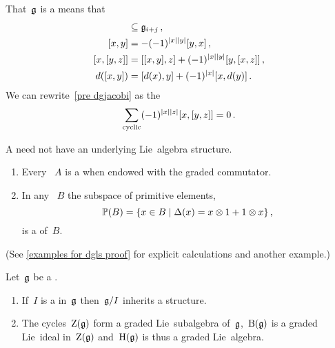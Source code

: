 \documentclass[a4paper,10pt,headings=standardclasses]{scrartcl}
\begin{document}
\begin{remark}
  That~$\mathfrak{g}$ is a {\dgl} means that
  \begin{align}
    [\glie_i, \glie_j]
    &\subseteq
    \glie_{i+j} \,,
    \notag
  \\
    [x,y]
    &=
    -(-1)^{\hdeg{x} \hdeg{y}} [y,x] \,,
    \notag
  \\
    [x, [y,z]]
    &=
    [[x,y], z]
    +
    (-1)^{\hdeg{x} \hdeg{y}}
    [y, [x,z]] \,,
    \label{pre dgjacobi}
  \\
    d([x,y])
    &=
    [d(x), y] + (-1)^{\hdeg{x}} [x, d(y)] \,.
    \notag
  \end{align}
  We can rewrite~\eqref{pre dgjacobi} as the 
  \[
    \sum_{\text{cyclic}}
    (-1)^{\lvert x\rvert \lvert z\rvert} [x, [y,z]]
    =
    0 \,.
  \]
\end{remark}

\begin{warning}
  A {\dgl} need not have an underlying Lie~algebra structure.
\end{warning}

\begin{example}
  \label{examples for dgls}
  \leavevmode
  \begin{enumerate}
    \item
      Every {\dga}~$A$ is a {\dgl} when endowed with the graded commutator.
    \item
      In any {\dgb}~$B$ the subspace of primitive elements,
      \[
        \prim(B)
        =
        \{
          x \in B
        \suchthat
          \Delta(x) = x \tensor 1 + 1 \tensor x
        \} \,,
      \]
      is a {\dglsub} of~$B$.
  \end{enumerate}
  (See \cref{examples for dgls proof} for explicit calculations and another example.)
\end{example}

\begin{lemma}
  \label{induced dgl}
  Let~$\mathfrak{g}$ be a {\dgl}.
  \begin{enumerate}
    \item
      If~$I$ is a {\dgli} in~$\mathfrak{g}$ then~$\mathfrak{g}/I$ inherits a {\dgl} structure.
    \item
      The cycles~$\operatorname{Z}(\mathfrak{g})$ form a graded Lie~subalgebra of~$\mathfrak{g}$,~$\operatorname{B}(\mathfrak{g})$ is a graded Lie~ideal in~$\operatorname{Z}(\mathfrak{g})$ and~$\operatorname{H}(\mathfrak{g})$ is thus a graded Lie~algebra. 
  \end{enumerate}
\end{lemma}
\end{document}
